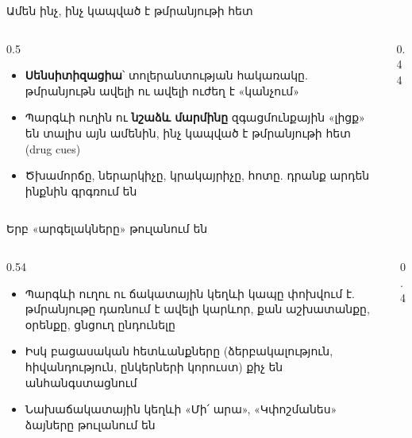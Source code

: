 \begin{frame}{Ամեն ինչ, ինչ կապված է թմրանյութի հետ}
  \begin{columns}[c]
    \begin{column}{0.5\textwidth}
      \begin{itemize}
        \item \textbf{Սենսիտիզացիա}՝ տոլերանտության հակառակը. թմրանյութն ավելի ու ավելի ուժեղ է «կանչում»
        \item<2-> Պարգևի ուղին ու \textbf{նշաձև մարմինը} զգացմունքային «լիցք» են տալիս այն ամենին, ինչ կապված է թմրանյութի հետ (drug cues)
        \item<3-> Ծխամորճը, ներարկիչը, կրակայրիչը, հոտը. դրանք արդեն ինքնին գրգռում են
      \end{itemize}
    \end{column}
    \begin{column}{0.44\textwidth}
    \end{column}
  \end{columns}
\end{frame}

\begin{frame}{Երբ «արգելակները» թուլանում են}
  \begin{columns}[c]
    \begin{column}{0.54\textwidth}
      \begin{itemize}
        \item Պարգևի ուղու ու ճակատային կեղևի կապը փոխվում է. թմրանյութը դառնում է ավելի կարևոր, քան աշխատանքը, օրենքը, ցնցուղ ընդունելը
        \item<2-> Իսկ բացասական հետևանքները (ձերբակալություն, հիվանդություն, ընկերների կորուստ) քիչ են անհանգստացնում
        \item<3-> Նախաճակատային կեղևի «Մի՛ արա», «Կփոշմանես» ձայները թուլանում են
      \end{itemize}
    \end{column}
    \begin{column}{0.4\textwidth}
    \end{column}
  \end{columns}
\end{frame}

